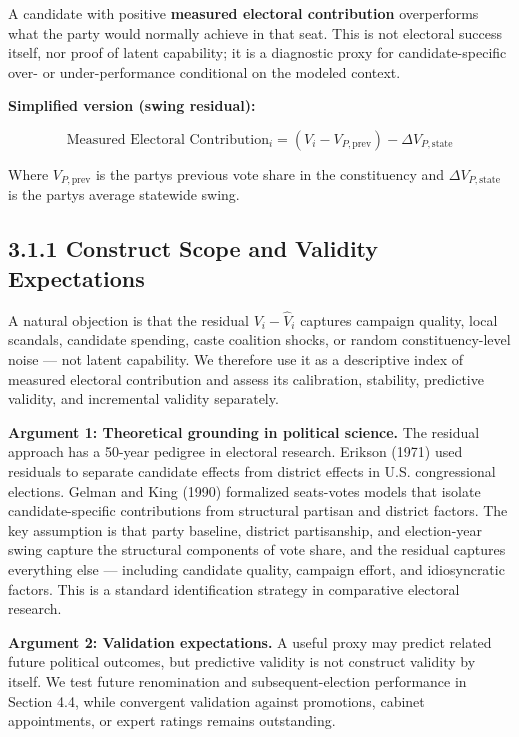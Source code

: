 \documentclass[
]{article}
\begin{document}
A candidate with positive \textbf{measured electoral contribution} overperforms what the party would normally achieve in that seat. This is not electoral success itself, nor proof of latent capability; it is a diagnostic proxy for candidate-specific over- or under-performance conditional on the modeled context.

\textbf{Simplified version (swing residual):}

\[\text{Measured Electoral Contribution}_i = (V_i - V_{P,\text{prev}}) - \Delta V_{P,\text{state}}\]

Where \(V_{P,\text{prev}}\) is the party\textquotesingle s previous vote share in the constituency and \(\Delta V_{P,\text{state}}\) is the party\textquotesingle s average statewide swing.

\subsection{3.1.1 Construct Scope and Validity Expectations}\label{311-construct-scope-and-validity-expectations}

A natural objection is that the residual \(V_i - \hat{V}_i\) captures campaign quality, local scandals, candidate spending, caste coalition shocks, or random constituency-level noise --- not latent capability. We therefore use it as a descriptive index of measured electoral contribution and assess its calibration, stability, predictive validity, and incremental validity separately.

\textbf{Argument 1: Theoretical grounding in political science.} The residual approach has a 50-year pedigree in electoral research. Erikson (1971) used residuals to separate candidate effects from district effects in U.S. congressional elections. Gelman and King (1990) formalized seats-votes models that isolate candidate-specific contributions from structural partisan and district factors. The key assumption is that party baseline, district partisanship, and election-year swing capture the structural components of vote share, and the residual captures everything else --- including candidate quality, campaign effort, and idiosyncratic factors. This is a standard identification strategy in comparative electoral research.

\textbf{Argument 2: Validation expectations.} A useful proxy may predict related future political outcomes, but predictive validity is not construct validity by itself. We test future renomination and subsequent-election performance in Section 4.4, while convergent validation against promotions, cabinet appointments, or expert ratings remains outstanding.
\end{document}
